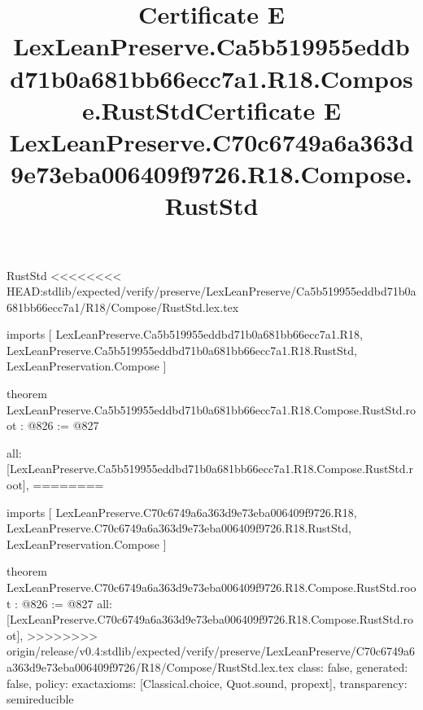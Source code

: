 \begin{lexlean}{RustStd}
<<<<<<<< HEAD:stdlib/expected/verify/preserve/LexLeanPreserve/Ca5b519955eddbd71b0a681bb66ecc7a1/R18/Compose/RustStd.lex.tex
\title{Certificate E LexLeanPreserve.Ca5b519955eddbd71b0a681bb66ecc7a1.R18.Compose.RustStd}
\begin{coremodule}
imports [
  LexLeanPreserve.Ca5b519955eddbd71b0a681bb66ecc7a1.R18,
  LexLeanPreserve.Ca5b519955eddbd71b0a681bb66ecc7a1.R18.RustStd,
  LexLeanPreservation.Compose
]

theorem LexLeanPreserve.Ca5b519955eddbd71b0a681bb66ecc7a1.R18.Compose.RustStd.root : @826 := @827 {
  all: [LexLeanPreserve.Ca5b519955eddbd71b0a681bb66ecc7a1.R18.Compose.RustStd.root],
========
\title{Certificate E LexLeanPreserve.C70c6749a6a363d9e73eba006409f9726.R18.Compose.RustStd}
\begin{coremodule}
imports [
  LexLeanPreserve.C70c6749a6a363d9e73eba006409f9726.R18,
  LexLeanPreserve.C70c6749a6a363d9e73eba006409f9726.R18.RustStd,
  LexLeanPreservation.Compose
]

theorem LexLeanPreserve.C70c6749a6a363d9e73eba006409f9726.R18.Compose.RustStd.root : @826 := @827 {
  all: [LexLeanPreserve.C70c6749a6a363d9e73eba006409f9726.R18.Compose.RustStd.root],
>>>>>>>> origin/release/v0.4:stdlib/expected/verify/preserve/LexLeanPreserve/C70c6749a6a363d9e73eba006409f9726/R18/Compose/RustStd.lex.tex
  class: false,
  generated: false,
  policy: exact{axioms: [Classical.choice, Quot.sound, propext]},
  transparency: semireducible
}


\end{coremodule}}
\end{coremodule}
\end{lexlean}
